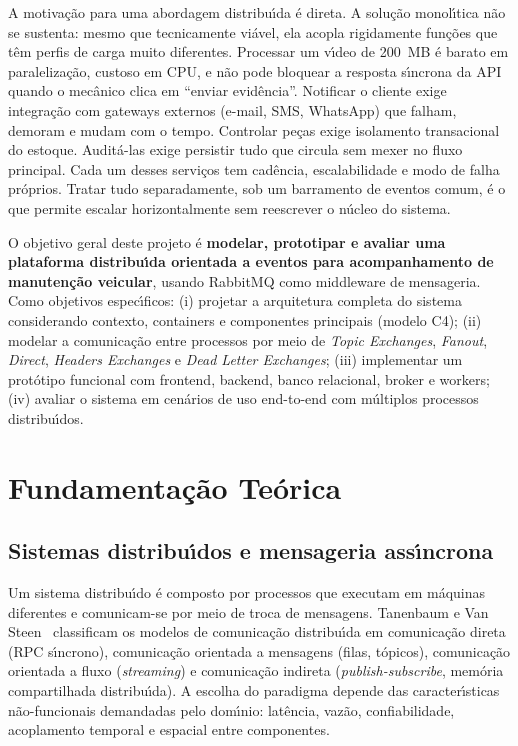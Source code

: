 \documentclass[10pt,a4paper]{article}
\begin{document}
A motiva\c{c}\~ao para uma abordagem distribu\'\i da \'e direta. A solu\c{c}\~ao monol\'\i tica n\~ao se sustenta: mesmo que tecnicamente vi\'avel, ela acopla rigidamente fun\c{c}\~oes que t\^em perfis de carga muito diferentes. Processar um v\'\i deo de 200~MB \'e barato em paraleliza\c{c}\~ao, custoso em CPU, e n\~ao pode bloquear a resposta s\'\i ncrona da API quando o mec\^anico clica em ``enviar evid\^encia''. Notificar o cliente exige integra\c{c}\~ao com gateways externos (e-mail, SMS, WhatsApp) que falham, demoram e mudam com o tempo. Controlar pe\c{c}as exige isolamento transacional do estoque. Audit\'a-las exige persistir tudo que circula sem mexer no fluxo principal. Cada um desses servi\c{c}os tem cad\^encia, escalabilidade e modo de falha pr\'oprios. Tratar tudo separadamente, sob um barramento de eventos comum, \'e o que permite escalar horizontalmente sem reescrever o n\'ucleo do sistema.

O objetivo geral deste projeto \'e \textbf{modelar, prototipar e avaliar uma plataforma distribu\'\i da orientada a eventos para acompanhamento de manuten\c{c}\~ao veicular}, usando RabbitMQ como middleware de mensageria. Como objetivos espec\'\i ficos: (i) projetar a arquitetura completa do sistema considerando contexto, containers e componentes principais (modelo C4); (ii) modelar a comunica\c{c}\~ao entre processos por meio de \emph{Topic Exchanges}, \emph{Fanout}, \emph{Direct}, \emph{Headers Exchanges} e \emph{Dead Letter Exchanges}; (iii) implementar um prot\'otipo funcional com frontend, backend, banco relacional, broker e workers; (iv) avaliar o sistema em cen\'arios de uso end-to-end com m\'ultiplos processos distribu\'\i dos.

\section{Fundamenta\c{c}\~ao Te\'orica}

\subsection{Sistemas distribu\'\i dos e mensageria ass\'\i ncrona}

Um sistema distribu\'\i do \'e composto por processos que executam em m\'aquinas diferentes e comunicam-se por meio de troca de mensagens. Tanenbaum e Van Steen~\cite{tanenbaum2017dist} classificam os modelos de comunica\c{c}\~ao distribu\'\i da em comunica\c{c}\~ao direta (RPC s\'\i ncrono), comunica\c{c}\~ao orientada a mensagens (filas, t\'opicos), comunica\c{c}\~ao orientada a fluxo (\emph{streaming}) e comunica\c{c}\~ao indireta (\emph{publish-subscribe}, mem\'oria compartilhada distribu\'\i da). A escolha do paradigma depende das caracter\'\i sticas n\~ao-funcionais demandadas pelo dom\'\i nio: lat\^encia, vaz\~ao, confiabilidade, acoplamento temporal e espacial entre componentes.
\end{document}

